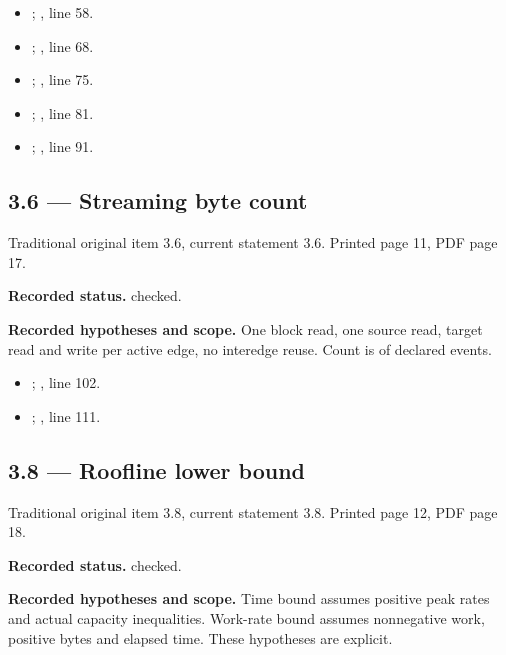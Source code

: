 \begin{itemize}
\item {}; , line 58.
\item {}; , line 68.
\item {}; , line 75.
\item {}; , line 81.
\item {}; , line 91.
\end{itemize}
\subsection{3.6 — Streaming byte count}
\label{result:3.6}
{\footnotesize\color{muted}Traditional original item 3.6, current statement 3.6. Printed page 11, PDF page 17.}\par
\textbf{Recorded status.} checked.

\textbf{Recorded hypotheses and scope.} One block read, one source read, target read and write per active edge, no interedge reuse. Count is of declared events.

\begin{itemize}
\item {}; , line 102.
\item {}; , line 111.
\end{itemize}
\subsection{3.8 — Roofline lower bound}
\label{result:3.8}
{\footnotesize\color{muted}Traditional original item 3.8, current statement 3.8. Printed page 12, PDF page 18.}\par
\textbf{Recorded status.} checked.

\textbf{Recorded hypotheses and scope.} Time bound assumes positive peak rates and actual capacity inequalities. Work-rate bound assumes nonnegative work, positive bytes and elapsed time. These hypotheses are explicit.

